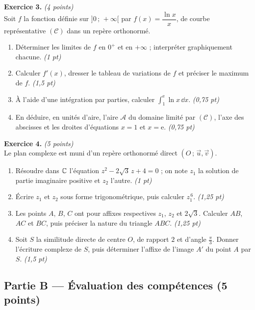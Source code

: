 \smallskip
\noindent\textbf{Exercice 3.} \hfill\textit{(4 points)}\\
Soit $f$ la fonction définie sur $]0\,;\,+\infty[$ par $f(x)=\dfrac{\ln x}{x}$, de courbe
représentative $(\mathcal{C})$ dans un repère orthonormé.
\begin{enumerate}[label=\arabic*)]
\item Déterminer les limites de $f$ en $0^+$ et en $+\infty$ ; interpréter graphiquement chacune. \hfill\textit{(1 pt)}
\item Calculer $f'(x)$, dresser le tableau de variations de $f$ et préciser le maximum de $f$. \hfill\textit{(1,5 pt)}
\item À l'aide d'une intégration par parties, calculer $\displaystyle\int_1^{\mathrm{e}}\ln x\,\dd x$. \hfill\textit{(0,75 pt)}
\item En déduire, en unités d'aire, l'aire $\mathcal{A}$ du domaine limité par $(\mathcal{C})$,
l'axe des abscisses et les droites d'équations $x=1$ et $x=\mathrm{e}$. \hfill\textit{(0,75 pt)}
\end{enumerate}

\smallskip
\noindent\textbf{Exercice 4.} \hfill\textit{(5 points)}\\
Le plan complexe est muni d'un repère orthonormé direct $(O\,;\,\vec u,\vec v)$.
\begin{enumerate}[label=\arabic*)]
\item Résoudre dans $\mathbb{C}$ l'équation $z^2-2\sqrt3\,z+4=0$ ; on note $z_1$ la solution de
partie imaginaire positive et $z_2$ l'autre. \hfill\textit{(1 pt)}
\item Écrire $z_1$ et $z_2$ sous forme trigonométrique, puis calculer $z_1^{\,6}$. \hfill\textit{(1,25 pt)}
\item Les points $A$, $B$, $C$ ont pour affixes respectives $z_1$, $z_2$ et $2\sqrt3$.
Calculer $AB$, $AC$ et $BC$, puis préciser la nature du triangle $ABC$. \hfill\textit{(1,25 pt)}
\item Soit $S$ la similitude directe de centre $O$, de rapport $2$ et d'angle $\frac\pi3$.
Donner l'écriture complexe de $S$, puis déterminer l'affixe de l'image $A'$ du point $A$ par $S$. \hfill\textit{(1,5 pt)}
\end{enumerate}

\subsection*{Partie B — Évaluation des compétences \hfill (5 points)}

